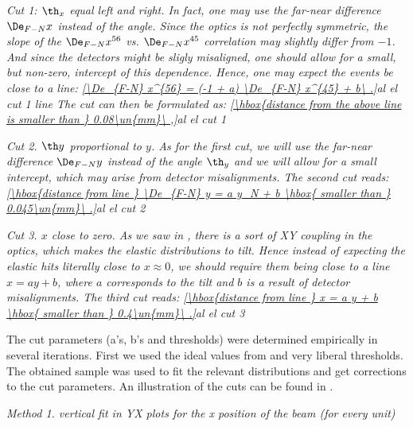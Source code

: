 \em{Cut 1}: $\th_x$ equal left and right. In fact, one may use the far-near difference $\De_{F-N} x$ instead of the angle. Since the optics is not perfectly symmetric, the slope of the $\De_{F-N} x^{56}$ vs. $\De_{F-N} x^{45}$ correlation may slightly differ from $-1$. And since the detectors might be sligly misaligned, one should allow for a small, but non-zero, intercept of this dependence. Hence, one may expect the events be close to a line:
\eqref{\De_{F-N} x^{56} = (-1 + a) \De_{F-N} x^{45} + b\ .}{al el cut 1 line}
The cut can then be formulated as:
\eqref{\hbox{distance from the above line is smaller than } 0.08\un{mm}\ ,}{al el cut 1}

\em{Cut 2}. $\th y$ proportional to $y$. As for the first cut, we will use the far-near difference $\De_{F-N} y$ instead of the angle $\th_y$ and we will allow for a small intercept, which may arise from detector misalignments. The second cut reads:
\eqref{\hbox{distance from line } \De_{F-N} y = a y_N + b \hbox{ smaller than } 0.045\un{mm}\ .}{al el cut 2}

\em{Cut 3}. $x$ close to zero. As we saw in , there is a sort of XY coupling in the optics, which makes the elastic distributions to tilt. Hence instead of expecting the elastic hits literally close to $x\approx 0$, we should require them being close to a line $x = ay + b$, where $a$ corresponds to the tilt and $b$ is a result of detector misalignments. The third cut reads:
\eqref{\hbox{distance from line } x = a y + b \hbox{ smaller than } 0.4\un{mm}\ .}{al el cut 3}

The cut parameters (a's, b's and thresholds) were determined empirically in several iterations. First we used the ideal values from  and very liberal thresholds. The obtained sample was used to fit the relevant distributions and get corrections to the cut parameters. An illustration of the cuts can be found in .




\em{Method 1}. vertical fit in YX plots for the x position of the beam (for every unit)



